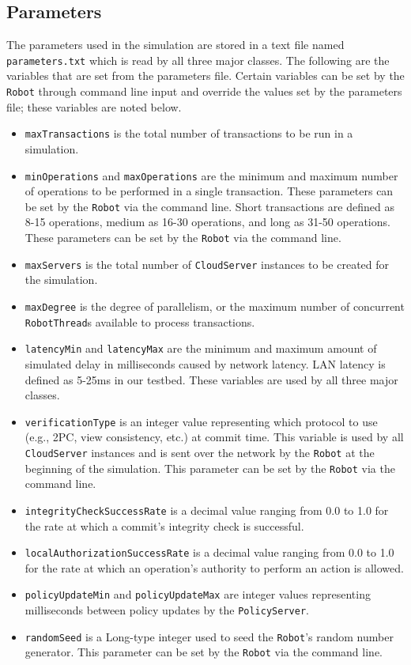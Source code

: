 \documentclass[11pt]{article}
\begin{document}
\subsection{Parameters}
The parameters used in the simulation are stored in a text file named \texttt{parameters.txt} which is read by all three major classes. The following are the variables that are set from the parameters file. Certain variables can be set by the \texttt{Robot} through command line input and override the values set by the parameters file; these variables are noted below.
\begin{itemize}
\item{}\texttt{maxTransactions} is the total number of transactions to be run in a simulation.
\item{}\texttt{minOperations} and \texttt{maxOperations} are the minimum and maximum number of operations to be performed in a single transaction. These parameters can be set by the \texttt{Robot} via the command line. Short transactions are defined as 8-15 operations, medium as 16-30 operations, and long as 31-50 operations. These parameters can be set by the \texttt{Robot} via the command line.
\item{}\texttt{maxServers} is the total number of \texttt{CloudServer} instances to be created for the simulation.
\item{}\texttt{maxDegree} is the degree of parallelism, or the maximum number of concurrent \texttt{RobotThread}s available to process transactions.
\item{}\texttt{latencyMin} and \texttt{latencyMax} are the minimum and maximum amount of simulated delay in milliseconds caused by network latency. LAN latency is defined as 5-25ms in our testbed. These variables are used by all three major classes.
\item{}\texttt{verificationType} is an integer value representing which protocol to use (e.g., 2PC, view consistency, etc.) at commit time. This variable is used by all \texttt{CloudServer} instances and is sent over the network by the \texttt{Robot} at the beginning of the simulation. This parameter can be set by the \texttt{Robot} via the command line.
\item{}\texttt{integrityCheckSuccessRate} is a decimal value ranging from 0.0 to 1.0 for the rate at which a commit's integrity check is successful.
\item{}\texttt{localAuthorizationSuccessRate} is a decimal value ranging from 0.0 to 1.0 for the rate at which an operation's authority to perform an action is allowed.
\item{}\texttt{policyUpdateMin} and \texttt{policyUpdateMax} are integer values representing milliseconds between policy updates by the \texttt{PolicyServer}.
\item{}\texttt{randomSeed} is a Long-type integer used to seed the \texttt{Robot}'s random number generator. This parameter can be set by the \texttt{Robot} via the command line.
\end{itemize}
\end{document}
